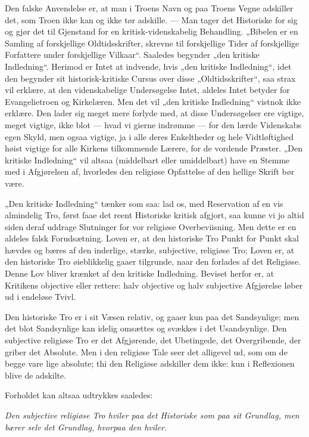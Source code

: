 \documentclass[12pt,a4paper]{book}
\newcommand{\opage}[1]{\marginnote{\footnotesize\textit{[#1]}}}
\begin{document}
Den falske Anvendelse er, at man i Troens Navn og paa Troens Vegne adskiller
det, som Troen ikke kan og ikke tør adskille. --- Man tager det Historiske for
sig og gjør det til Gjenstand for en kritisk-videnskabelig Behandling. „Bibelen
er en Samling af forskjellige Oldtidsskrifter, skrevne til forskjellige Tider
af forskjellige Forfattere under forskjellige Vilkaar“. Saaledes begynder „den
kritiske Indledning“. Herimod er Intet at indvende, hvis „den kritiske
Indledning“, idet den begynder sit historisk-kritiske Cursus over disse
„Oldtidsskrifter“, saa strax vil erklære, at den videnskabelige Undersøgelse
Intet, aldeles Intet betyder for Evangelietroen og Kirkelæren. Men det vil „den
kritiske Indledning“ vistnok ikke erklære. Den lader sig meget mere forlyde
med, at disse Undersøgelser ere vigtige, meget vigtige, ikke blot --- hvad vi
gierne indrømme --- for den lærde Videnskabs egen Skyld, men ogsaa vigtige, ja
i alle deres Enkeltheder og hele Vidtløftighed høist vigtige for alle Kirkens
tilkommende Lærere, for de vordende Præster. „Den kritiske Indledning“ vil
altsaa (middelbart eller umiddelbart) have en Stemme med i Afgjørelsen af,
hvorledes den religiøse Opfattelse af den hellige Skrift bør være.

„Den kritiske Indledning“ tænker som saa: lad os, med Reservation af en vis
almindelig Tro, først faae det reent Historiske kritisk afgjort, saa kunne vi
jo altid siden deraf uddrage Slutninger for vor religiøse Overbeviisning. Men
dette er en aldeles falsk Forudsætning. Loven er, at den historiske Tro Punkt
for Punkt skal hævdes og bæres af den inderlige, stærke, subjective, religiøse
Tro; Loven er, at den historiske Tro øieblikkelig gaaer tilgrunde, naar den
forlades af det Religiøse. Denne Lov
\opage{20} bliver krænket af den kritiske Indledning. Beviset herfor er, at Kritikens
objective eller rettere: halv objective og halv subjective Afgjørelse løber ud
i endeløse Tvivl.

Den historiske Tro er i sit Væsen relativ, og gaaer kun paa det Sandsynlige;
men det blot Sandsynlige kan idelig omsættes og svækkes i det Usandsynlige. Den
subjective religiøse Tro er det Afgjørende, det Ubetingede, det Overgribende,
der griber det Absolute. Men i den religiøse Tale seer det alligevel ud, som om
de begge vare lige absolute; thi den Religiøse adskiller dem ikke: kun i
Reflexionen blive de adskilte.

Forholdet kan altsaa udtrykkes saaledes:

\emph{Den subjective religiøse Tro hviler paa det Historiske som paa sit
Grundlag, men bærer selv det Grundlag, hvorpaa den hviler.}
\end{document}

